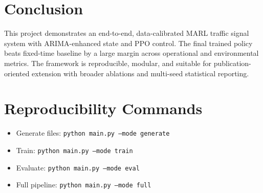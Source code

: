 \documentclass[conference]{IEEEtran}
\begin{document}
\section{Conclusion}
This project demonstrates an end-to-end, data-calibrated MARL traffic signal system with ARIMA-enhanced state and PPO control. The final trained policy beats fixed-time baseline by a large margin across operational and environmental metrics. The framework is reproducible, modular, and suitable for publication-oriented extension with broader ablations and multi-seed statistical reporting.

\section*{Reproducibility Commands}
\begin{itemize}
    \item Generate files: \texttt{python main.py --mode generate}
    \item Train: \texttt{python main.py --mode train}
    \item Evaluate: \texttt{python main.py --mode eval}
    \item Full pipeline: \texttt{python main.py --mode full}
\end{itemize}



\end{document}
